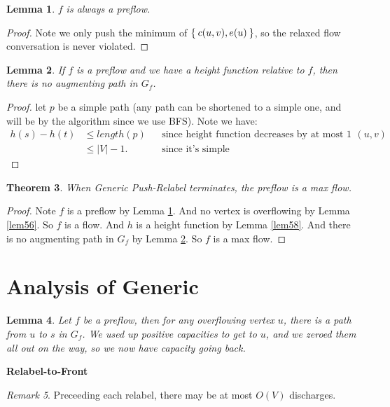\documentclass[reqno]{amsbook}
\theoremstyle{plain}
\newtheorem{theorem}{Theorem}[chapter]
\numberwithin{section}{chapter}
\numberwithin{equation}{chapter}
\newtheorem{lem}[theorem]{Lemma}
\theoremstyle{definition}
\theoremstyle{remark}
\newtheorem{rem}[theorem]{Remark}
\newcommand{\bee}{\begin{equation}\begin{aligned}}
\newcommand{\eee}{\end{aligned}\end{equation}}
\begin{document}
\begin{lem}\label{lem59}
$f$ is always a preflow. 
\end{lem}

\begin{proof}
Note we only push the minimum of $\Set{c(u,v),e(u)}$, so the relaxed flow conversation is never violated. 
\end{proof}

\begin{lem}\label{lem510}
If $f$ is a preflow and we have a height function relative to $f$, then there is no augmenting path in $G_f$. 
\end{lem}

\begin{proof}
let $p$ be a simple path (any path can be shortened to a simple one, and will be by the algorithm since we use BFS).  
Note we have:
\bee
h(s) - h(t) &\leq length(p) && \text{since height function decreases by at most 1 in an edge $(u,v)$}\\
&\leq |V| - 1. && \text{since it's simple}
\eee
\end{proof}

\begin{theorem}
When Generic Push-Relabel terminates, the preflow is a max flow. 
\end{theorem}

\begin{proof}
Note $f$ is a preflow by Lemma \ref{lem59}. And no vertex is overflowing by Lemma \ref{lem56}. So $f$ is a flow. And $h$ is a height function by Lemma \ref{lem58}. And there is no augmenting path in $G_f$ by Lemma \ref{lem510}. So $f$ is a max flow. 
\end{proof}

\section{Analysis of Generic}

\begin{lem}
Let $f$ be a preflow, then for any overflowing vertex $u$, there is a path from $u$ to $s$ in $G_f$. We used up positive capacities to get to $u$, and we zeroed them all out on the way, so we now have capacity going back. 
\end{lem}


\textbf{Relabel-to-Front}

\begin{rem}
Preceeding each relabel, there may be at most $O(V)$ discharges. 
\end{rem}
\end{document}
